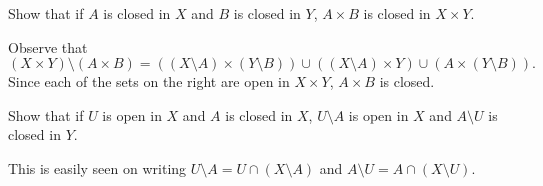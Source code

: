 	\begin{exercise}
		Show that if $A$ is closed in $X$ and $B$ is closed in $Y$, $A\times B$ is closed in $X\times Y$.
	\end{exercise}
	\begin{solution*}
		Observe that
		\[ (X\times Y) \setminus (A\times B) = ((X\setminus A)\times (Y\setminus B)) \cup ((X\setminus A)\times Y) \cup (A\times (Y\setminus B)). \]
		Since each of the sets on the right are open in $X\times Y$, $A\times B$ is closed.
	\end{solution*}

	\begin{exercise}
		Show that if $U$ is open in $X$ and $A$ is closed in $X$, $U\setminus A$ is open in $X$ and $A\setminus U$ is closed in $Y$.
	\end{exercise}
	\begin{solution*}
		This is easily seen on writing $U\setminus A = U \cap (X\setminus A)$ and $A\setminus U = A \cap (X\setminus U)$.
	\end{solution*}

